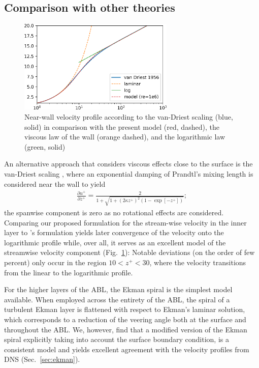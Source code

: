 \documentclass[smallcondensed,final]{svjour3}
\newcommand{\p}{\partial}
\begin{document}
\subsection{Comparison with other theories}
\begin{figure}
  \centerline{\includegraphics[width=0.66\textwidth]{Fig11.eps}} %
  \caption{Near-wall velocity profile according to the 
    van-Driest scaling (blue, solid) in comparison with 
    the present model (red, dashed), 
    the viscous law of the wall (orange dashed), and 
    the logarithmic law (green, solid)} 
  \label{fig:vanDriest}
\end{figure}  An alternative approach that considers viscous effects close to the surface is the van-Driest scaling \citep{vandriest:JOT1956}, 
where an exponential damping of Prandtl's mixing length is considered near the wall to yield 
\begin{align}
  \frac{\p u^+}{\p z^+} = \frac{2}{ 1+ \sqrt{1+\left(2\kappa z^+\right)^2 (1-\exp\left[-z^+\right])}};
\end{align}
the spanwise component is zero as no rotational effects are considered. 
%
Comparing our proposed formulation for the stream-wise velocity in the inner layer to  \citeauthor{vandriest:JOT1956}'s formulation yields later convergence of the velocity onto the logarithmic profile while, over all, it serves as an excellent model of the streamwise velocity component (Fig.~\ref{fig:vanDriest}):
% 
Notable deviations (on the order of few percent) only occur in the region $10 < z^+ < 30$,  where the velocity transitions from the linear to the logarithmic profile. 
%
\par
%
For the higher layers of the ABL, the Ekman spiral is the simplest model available. 
%
When employed across the entirety of the ABL, the spiral of a turbulent Ekman layer is flattened with respect to Ekman's laminar solution, which  corresponds to a reduction of the veering angle both at the surface and throughout the ABL. 
%
We, however, find that a modified version of the Ekman spiral explicitly taking into account the surface boundary condition, is a consistent model and yields excellent agreement with the velocity profiles from DNS (Sec.~\ref{sec:ekman}). 
\end{document}

